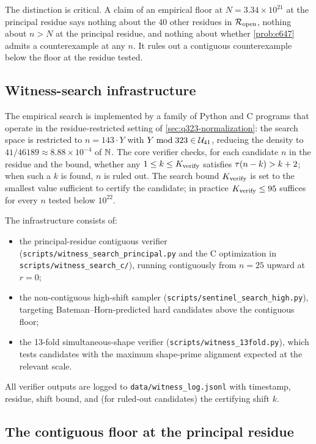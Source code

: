 The distinction is critical. A claim of an empirical floor at
$N = 3.34 \times 10^{21}$ at the principal residue says nothing
about the 40 other residues in $\mathcal{R}_{\mathrm{open}}$, nothing about $n > N$ at
the principal residue, and nothing about whether \cref{prob:e647}
admits a counterexample at any $n$. It rules out a contiguous
counterexample below the floor at the residue tested.

\subsection{Witness-search infrastructure}
\label{sec:empirical-infrastructure}

The empirical search is implemented by a family of Python and C
programs that operate in the residue-restricted setting of
\cref{sec:q323-normalization}: the search space is restricted to
$n = 143 \cdot Y$ with $Y \bmod 323 \in \mathcal{U}_{41}$, reducing the
density to $41 / 46189 \approx 8.88 \times 10^{-4}$ of $\mathbb{N}$. The
core verifier checks, for each candidate $n$ in the residue and the
bound, whether any $1 \le k \le K_{\rm verify}$ satisfies
$\tau(n - k) > k + 2$; when such a $k$ is found, $n$ is ruled
out. The search bound $K_{\rm verify}$ is set to the smallest value
sufficient to certify the candidate; in practice $K_{\rm verify}
\le 95$ suffices for every $n$ tested below $10^{22}$.

The infrastructure consists of:
\begin{itemize}[leftmargin=*]
\item the principal-residue contiguous verifier
  (\texttt{scripts/witness\_search\_principal.py} and the C
  optimization in \texttt{scripts/witness\_search\_c/}), running
  contiguously from $n = 25$ upward at $r = 0$;
\item the non-contiguous high-shift sampler
  (\texttt{scripts/sentinel\_search\_high.py}), targeting
  Bateman--Horn-predicted hard candidates above the contiguous
  floor;
\item the 13-fold simultaneous-shape verifier
  (\texttt{scripts/witness\_13fold.py}), which tests candidates
  with the maximum shape-prime alignment expected at the relevant
  scale.
\end{itemize}
All verifier outputs are logged to \texttt{data/witness\_log.jsonl}
with timestamp, residue, shift bound, and (for ruled-out
candidates) the certifying shift $k$.

\subsection{The contiguous floor at the principal residue}
\label{sec:empirical-contiguous-floor}

